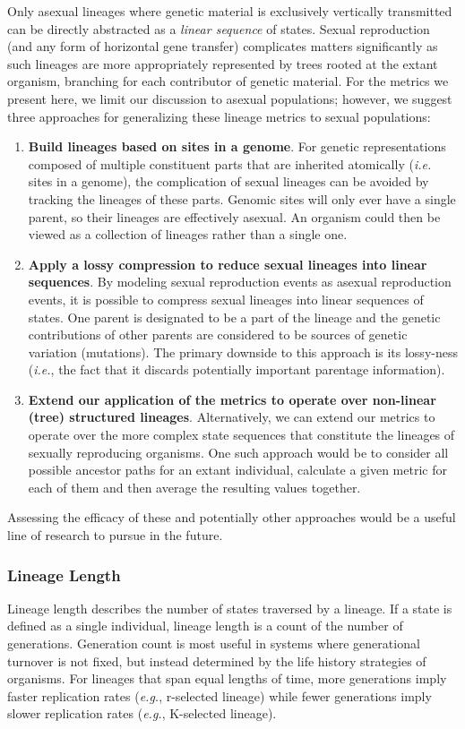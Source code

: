 \documentclass[letterpaper]{article}
\begin{document}
Only asexual lineages %
where genetic material is exclusively vertically transmitted can be directly abstracted as a \textit{linear sequence} of states.
Sexual reproduction (and any form of horizontal gene transfer) complicates matters significantly as such lineages are more appropriately represented by trees rooted at the extant organism, branching for each contributor of genetic material. For the metrics we present here, we limit our discussion to asexual populations; however, we suggest three approaches for generalizing these lineage metrics to sexual populations: 
\begin{enumerate}
\item \textbf{Build lineages based on sites in a genome}. For genetic representations composed of multiple constituent parts that are inherited atomically (\textit{i.e.} sites in a genome), the complication of sexual lineages can be avoided by tracking the lineages of these parts. Genomic sites will only ever have a single parent, so their lineages are effectively asexual. An organism could then be viewed as a collection of lineages rather than a single one.
\item \textbf{Apply a lossy compression to reduce sexual lineages into linear sequences}. By modeling sexual reproduction events as asexual reproduction events, it is possible to compress sexual lineages into linear sequences of states. One parent is designated to be a part of the lineage and the genetic contributions of other parents are considered to be sources of genetic variation (mutations). The primary downside to this approach is its lossy-ness (\textit{i.e.}, the fact that it discards potentially important parentage information).  
\item \textbf{Extend our application of the metrics to operate over non-linear (tree) structured lineages}. Alternatively, we can extend our metrics to operate over the more complex state sequences that constitute the lineages of sexually reproducing organisms. One such approach would be to consider all possible ancestor paths for an extant individual, calculate a given metric for each of them and then average the resulting values together.
\end{enumerate}

Assessing the efficacy of these and potentially other approaches would be a useful line of research to pursue in the future.

\subsubsection{Lineage Length}
Lineage length describes the number of states traversed by a lineage. If a state is defined as a single individual, lineage length is a count of the number of generations. Generation count is most useful in systems where generational turnover is not fixed, but instead determined by the life history strategies of organisms. For lineages that span equal lengths of time, more generations imply faster replication rates (\textit{e.g.}, r-selected lineage) while fewer generations imply slower replication rates (\textit{e.g.}, K-selected lineage). 
\end{document}
